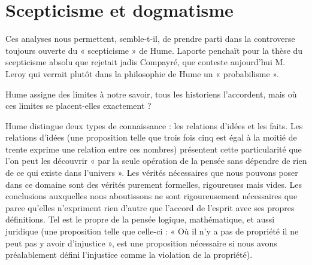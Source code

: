 
\section{Scepticisme et dogmatisme}
Ces analyses nous permettent, semble-t-il, de prendre
parti dans la controverse toujours ouverte du « scepticisme » 
de Hume. Laporte penchaït pour la thèse du
scepticisme absolu que rejetait jadis Compayré, que
conteste aujourd’hui M. Leroy qui verrait plutôt dans la
philosophie de Hume un « probabilisme ».

Hume assigne des limites à notre savoir, tous les historiens 
l’accordent, mais où ces limites se placent-elles
exactement ?

Hume distingue deux types de connaissance : les relations 
d’idées et les faits. Les relations d’idées (une proposition 
telle que trois fois cinq est égal à la moitié de trente
exprime une relation entre ces nombres) présentent cette
particularité que l’on peut les découvrir « par la seule
opération de la pensée sans dépendre de rien de ce qui
existe dans l’univers ». Les vérités nécessaires que nous
pouvons poser dans ce domaine sont des vérités purement
formelles, rigoureuses mais vides. Les conclusions auxquelles 
nous aboutissons ne sont rigoureusement nécessaires 
que parce qu’elles n’expriment rien d’autre que
l'accord de l'esprit avec ses propres définitions. Tel est
le propre de la pensée logique, mathématique, et aussi
juridique (une proposition telle que celle-ci : « Où il n’y
a pas de propriété il ne peut pas y avoir d’injustice »,
est une proposition nécessaire si nous avons préalablement
défini l'injustice comme la violation de la propriété).

